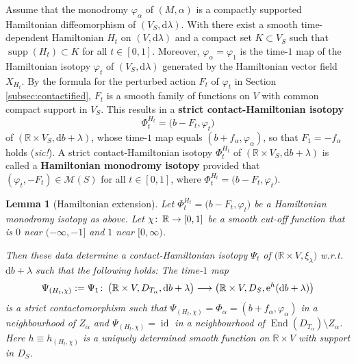 \documentclass{amsart}
\newtheorem{lem}[prop]{Lemma}
\theoremstyle{definition}
\def\co{\colon\thinspace}
\newcommand{\rmd}{\mathrm d}
\newcommand{\rme}{\mathrm e}
\newcommand{\MM}{\mathcal M}
\newcommand{\R}{\mathbb R}
\newcommand{\lra}{\longrightarrow}
\newcommand{\ra}{\rightarrow}
\DeclareMathOperator{\End}{\mathrm{End}}
\DeclareMathOperator{\id}{\mathrm{id}}
\DeclareMathOperator{\supp}{\mathrm{supp}}
\begin{document}
Assume that the monodromy $\varphi_{\alpha}$
of $(M,\alpha)$
is a compactly supported
Hamiltonian diffeomorphism
of $(V_S,\rmd\lambda)$.
With \cite[Definition~3.1.13]{mcdsal17}
there exist a smooth time-dependent Hamiltonian
$H_t$ on $(V,\rmd\lambda)$
and a compact set $K\subset V_S$
such that $\supp(H_t)\subset K$
for all $t\in[0,1]$.
Moreover,
$\varphi_{\alpha}=\varphi_1$ is the time-$1$ map
of the Hamiltonian isotopy $\varphi_t$
of $(V_S,\rmd\lambda)$
generated by the Hamiltonian vector field $X_{H_t}$.
By the formula for
the perturbed action $F_t$ of $\varphi_t$
in Section \ref{subsec:contactified},
$F_t$ is a smooth family of functions on $V$
with common compact support in $V_S$.
This results in a {\bf strict contact-Hamiltonian isotopy}
\[
\Phi_t^{H_t}=\big(b-F_t,\varphi_t\big)
\]
of $(\R\times V_S,\rmd b+\lambda)$,
whose time-$1$ map equals
$(b+f_{\alpha},\varphi_{\alpha})$,
so that $F_1=-f_{\alpha}$ holds ({\it sic!}).
A strict contact-Hamiltonian isotopy
$\Phi_t^{H_t}$ of $(\R\times V_S,\rmd b+\lambda)$
is called a {\bf Hamiltonian monodromy isotopy}
provided that $(\varphi_t,-F_t)\in\MM(S)$ for all $t\in[0,1]$,
where $\Phi_t^{H_t}=\big(b-F_t,\varphi_t\big)$.

\begin{lem}[Hamiltonian extension]
 \label{lem:contifnotrappedorbitshamiltonianmonod}
 Let $\Phi_t^{H_t}=\big(b-F_t,\varphi_t\big)$
 be a Hamiltonian monodromy isotopy as above.
 Let $\chi\co\R\ra[0,1]$ be a smooth cut-off function
 that is $0$ near $(-\infty,-1]$ and $1$ near $[0,\infty)$.
 
 Then these data determine
 a contact-Hamiltonian isotopy $\Psi_t$ of
 $\big(\R\times V,\xi_{\lambda}\big)$
 w.r.t.\ $\rmd b+\lambda$
 such that the following holds:
 The time-$1$ map
 \[
   \Psi_{(H_t,\chi)}:=\Psi_1\co
   \big(\R\times V,D_{T_{\alpha}},\rmd b+\lambda\big)
   \lra
   \big(\R\times V,D_S,\rme^h(\rmd b+\lambda)\big)
 \]
 is a strict contactomorphism
 such that $\Psi_{(H_t,\chi)}=\Phi_{\alpha}=(b+f_{\alpha},\varphi_{\alpha})$
 in a neighbourhood of $Z_{\alpha}$
 and $\Psi_{(H_t,\chi)}=\id$ in a neighbourhood of
 $\End(D_{T_{\alpha}})\setminus Z_{\alpha}$.
 Here $h\equiv h_{(H_t,\chi)}$
 is a uniquely determined smooth function on $\R\times V$ with support in $D_S$.
\end{lem}
\end{document}
